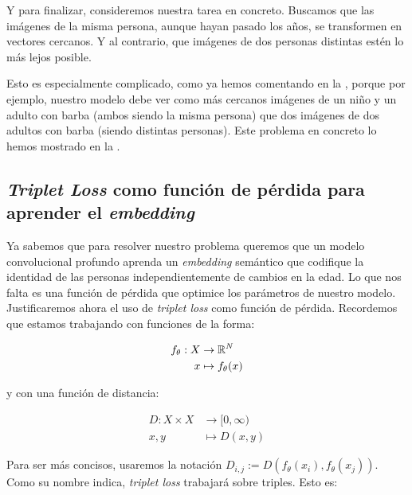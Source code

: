 \begin{ejemplo}

	Y para finalizar, consideremos nuestra tarea en concreto. Buscamos que las imágenes de la misma persona, aunque hayan pasado los años, se transformen en vectores cercanos. Y al contrario, que imágenes de dos personas distintas estén lo más lejos posible.

	Esto es especialmente complicado, como ya hemos comentando en la , porque por ejemplo, nuestro modelo debe ver como más cercanos imágenes de un niño y un adulto con barba (ambos siendo la misma persona) que dos imágenes de dos adultos con barba (siendo distintas personas). Este problema en concreto lo hemos mostrado en la .
\end{ejemplo}


\subsection{\textit{Triplet Loss} como función de pérdida para aprender el \textit{embedding}} \label{isec:triplet_loss}

Ya sabemos que para resolver nuestro problema queremos que un modelo convolucional profundo aprenda un \textit{embedding} semántico que codifique la identidad de las personas independientemente de cambios en la edad. Lo que nos falta es una función de pérdida que optimice los parámetros de nuestro modelo. Justificaremos ahora el uso de \textit{triplet loss} como función de pérdida. Recordemos que estamos trabajando con funciones de la forma:

\begin{equation}
	\begin{split}
		f_{\theta}: X & \to \mathbb{R}^N \\
		x & \mapsto f_{\theta}(x)
	\end{split}
\end{equation}

y con una función de distancia:

\begin{equation}
	\begin{split}
		D: X \times X & \to [0, \infty) \\
		x, y & \mapsto D(x, y)
	\end{split}
\end{equation}

Para ser más concisos, usaremos la notación $D_{i, j} := D(f_{\theta}(x_i), f_{\theta}(x_j))$. Como su nombre indica, \textit{triplet loss} trabajará sobre triples. Esto es:

